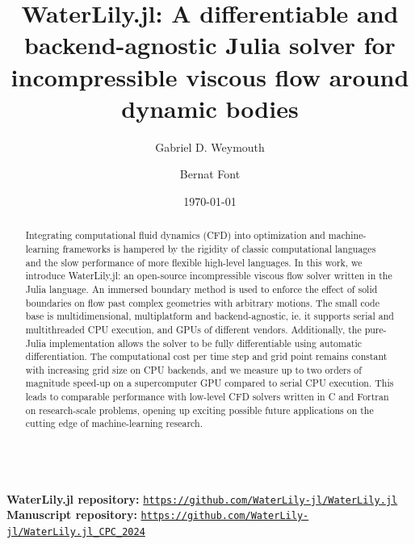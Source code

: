 \documentclass[10pt,a4paper]{article}
\title{\textbf{WaterLily.jl: A differentiable and backend-agnostic Julia solver for incompressible viscous flow around dynamic bodies}}
\author[1]{Gabriel D. Weymouth}
\author[1,2,\footnote{\href{mailto:b.font@tudelft.nl}{\texttt{b.font@tudelft.nl}}}]{Bernat Font}
\affil[1]{Faculty of Mechanical Engineering, Delft University of Technology, Delft, Netherlands}
\affil[2]{Barcelona Supercomputing Center, Barcelona, Spain}
\date{\today}
\begin{document}
{\let\newpage\relax\maketitle}
\setlength{\parindent}{0pt}
\setlength{\parskip}{8pt}

\date{\vspace{-20pt}}
\begin{abstract}
Integrating computational fluid dynamics (CFD)  into optimization and machine-learning frameworks is hampered by the rigidity of classic computational languages and the slow performance of more flexible high-level languages. In this work, we introduce WaterLily.jl: an open-source incompressible viscous flow solver written in the Julia language. An immersed boundary method is used to enforce the effect of solid boundaries on flow past complex geometries with arbitrary motions. The small code base is multidimensional, multiplatform and backend-agnostic, ie. it supports serial and multithreaded CPU execution, and GPUs of different vendors. Additionally, the pure-Julia implementation allows the solver to be fully differentiable using automatic differentiation. The computational cost per time step and grid point remains constant with increasing grid size on CPU backends, and we measure up to two orders of magnitude speed-up on a supercomputer GPU compared to serial CPU execution. This leads to comparable performance with low-level CFD solvers written in C and Fortran on research-scale problems, opening up exciting possible future applications on the cutting edge of machine-learning research.
\end{abstract}

\begin{small}
  \noindent
  \\
  \textbf{WaterLily.jl repository:} \href{https://github.com/WaterLily-jl/WaterLily.jl}{\texttt{https://github.com/WaterLily-jl/WaterLily.jl}}\\
  \textbf{Manuscript repository:} \href{https://github.com/WaterLily-jl/WaterLily.jl_CPC_2024}{\texttt{https://github.com/WaterLily-jl/WaterLily.jl\_CPC\_2024}}
\end{small}
\end{document}
